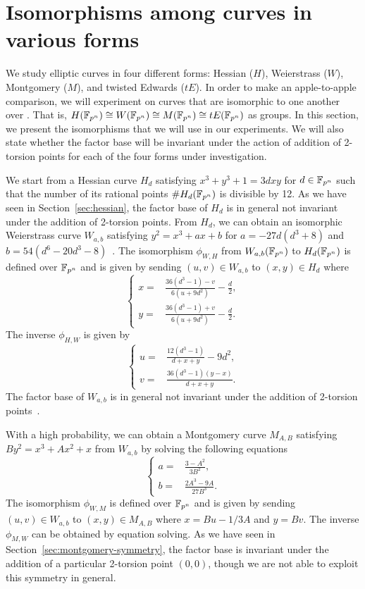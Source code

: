 %
%

\section{Isomorphisms among curves in various forms}
\label{sec:isomorphism}

We study elliptic curves in four different forms: Hessian ($H$),
Weierstrass ($W$), Montgomery ($M$), and twisted Edwards ($tE$).
%
In order to make an apple-to-apple comparison, we will experiment on
curves that are isomorphic to one another over .
%
That is, $H(\mathbb F_{p^n})\cong W(\mathbb F_{p^n})\cong M(\mathbb F_{p^n})\cong tE(\mathbb F_{p^n})$
as groups.
%
In this section, we present the isomorphisms that we will use in our
experiments.
%
We will also state whether the factor base will be invariant under the
action of addition of 2-torsion points for each of the four forms
under investigation.

We start from a Hessian curve $H_d$ satisfying $x^3 + y^3 + 1 = 3dxy$
for $d\in\mathbb F_{p^n}$ such that the number of its rational points
$\#H_d(\mathbb F_{p^n})$ is divisible by 12.
%
As we have seen in Section~\ref{sec:hessian}, the factor base of $H_d$
is in general not invariant under the addition of 2-torsion points.
%
From $H_d$, we can obtain an isomorphic Weierstrass curve $W_{a,b}$
satisfying $y^2 = x^3 + ax + b$ for $a = - 27d(d^3 + 8)$ and
$b = 54(d^6 - 20d^3 - 8)$~\cite{DBLP:conf/ches/Smart01}.
%
The isomorphism $\phi_{W,H}$ from $W_{a,b}(\mathbb F_{p^n})$ to $H_d(\mathbb F_{p^n})$
is defined over $\mathbb F_{p^n}$ and is given by sending $(u,v)\in W_{a,b}$
to $(x,y)\in H_d$ where
\[ \left\{\begin{aligned}
x = & \frac{36(d^3 - 1) - v}{6(u + 9d^2)} - \frac{d}{2}, \\
y = & \frac{36(d^3 - 1) + v}{6(u + 9d^2)} - \frac{d}{2}.
\end{aligned}\right. \]
%
The inverse $\phi_{H,W}$ is given by
\[ \left\{\begin{aligned}
u = & \frac{12(d^3 - 1)}{d + x + y} - 9d^2, \\
v = & \frac{36(d^3 - 1)(y - x)}{d + x + y}.
\end{aligned}\right. \]
%
The factor base of $W_{a,b}$ is in general not invariant under the
addition of 2-torsion points~\cite{DBLP:journals/joc/FaugereGHR14}.

With a high probability, we can obtain a Montgomery curve $M_{A,B}$
satisfying $By^2 = x^3 + Ax^2 + x$ from $W_{a,b}$ by solving the
following equations
%
\[ \left\{\begin{aligned}
a = & \frac{3 - A^2}{3B^2}, \\
b = & \frac{2A^3 - 9A}{27B^3}.
\end{aligned}\right. \]
%
The isomorphism $\phi_{W,M}$ is defined over
$\mathbb F_{p^n}$ and is given by sending $(u,v)\in W_{a,b}$ to
$(x,y)\in M_{A,B}$ where $x = Bu - 1/3A$ and $y = Bv$.
%
The inverse $\phi_{M,W}$ can be obtained by equation solving.
%
As we have seen in Section~\ref{sec:montgomery-symmetry}, the factor
base is invariant under the addition of a particular 2-torsion point
$(0,0)$, though we are not able to exploit this symmetry in general.

